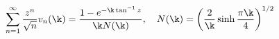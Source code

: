 \begin{equation}\sum_{n=1}^\infty
\frac{z^n}{\sqrt{n}}v_n(\k)=\frac{1-e^{-\k\tan^{-1}z}}{\k N(\k)},\
\ \ N(\k)=\left(\frac{2}{\k}\sinh\frac{\pi
\k}{4}\right)^{1/2}\label{eq:gen-func}\end{equation} 
